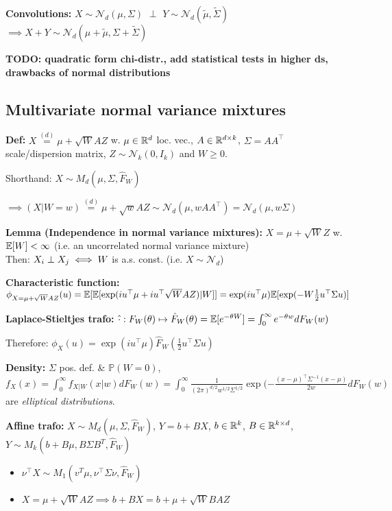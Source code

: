 \textbf{Convolutions:} $X\sim\mathcal{N}_d(\mu,\Sigma)$ $\perp$ $Y\sim\mathcal{N}_d(\tilde \mu, \tilde \Sigma)$\\
$\implies X+Y\sim\mathcal{N}_d(\mu+\tilde \mu, \Sigma + \tilde \Sigma)$

\textbf{TODO: quadratic form chi-distr., add statistical tests in higher ds, drawbacks of normal distributions}

\subsection*{Multivariate normal variance mixtures}

\textbf{Def:} $X\stackrel{(d)}{=}\mu + \sqrt W A Z$ w. $\mu\in\mathbb{R}^d$ loc. vec., $A\in\mathbb{R}^{d\times k}$, $\Sigma=AA^\top$ scale/dispersion matrix, $Z\sim\mathcal{N}_k(0,I_k)$ and $W\geq 0$.

Shorthand: $X\sim M_d(\mu,\Sigma,\hat F_W)$

$\implies (X|W=w)\stackrel{(d)}{=}\mu+\sqrt w A Z\sim \mathcal{N}_d(\mu, wAA^\top)=\mathcal{N}_d(\mu, w\Sigma)$

\textbf{Lemma (Independence in normal variance mixtures):}
$X=\mu+\sqrt W Z$ w. $\mathbb{E}[W]<\infty$ (i.e. an uncorrelated normal variance mixture)\\
Then: $X_i\perp X_j \iff W$ is a.s. const. (i.e. $X\sim\mathcal{N}_d$)

\textbf{Characteristic function:} $\phi_{X=\mu+\sqrt W A Z}(u)=\mathbb{E}[\mathbb{E}[\exp(iu^\top\mu+iu^\top\sqrt W A Z)|W]]=\exp(iu^\top\mu)\mathbb{E}[\exp(-W\frac{1}{2}u^\top\Sigma u)]$


\textbf{Laplace-Stieltjes trafo:} $\hat{\cdot}: F_W(\theta)\mapsto \hat F_W(\theta)=\mathbb{E}[e^{-\theta W}]=\int_0^\infty e^{-\theta w}dF_W(w)$

Therefore: $\phi_X(u)=\exp(i u^\top \mu)\hat F_W(\frac{1}{2}u^\top\Sigma u)$

\textbf{Density:} $\Sigma$ pos. def. \& $\mathbb{P}(W=0)$,
$f_X(x)=\int_0^\infty f_{X|W}(x|w) dF_W(w)=\int_0^\infty \frac{1}{(2\pi)^{d/2}w^{1/2}\Sigma^{1/2}}\exp(-\frac{(x-\mu)^\top\Sigma^{-1}(x-\mu)}{2w}dF_W(w)$ are \textit{elliptical distributions}.

\textbf{Affine trafo:} $X\sim M_d(\mu,\Sigma, \hat F_W)$, $Y=b+BX$, $b\in\mathbb{R}^k$, $B\in\mathbb{R}^{k\times d}$, $Y\sim M_k(b+B\mu, B\Sigma B^T,\hat F_W)$

\begin{itemize}
    \item $\nu^\top X\sim M_1(v^T\mu, \nu^\top\Sigma\nu,\hat F_W)$
    \item $X=\mu+\sqrt W A Z \implies b+BX=b+\mu+\sqrt W B A Z$
\end{itemize}

